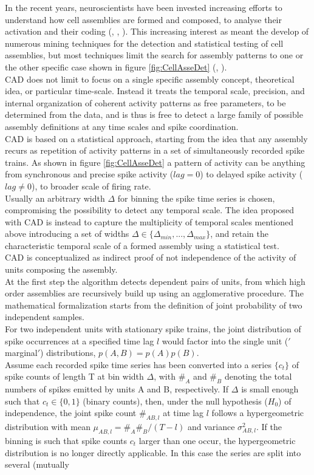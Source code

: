 \begin{framed}
In the recent years, neuroscientists have been invested increasing efforts to understand how cell assemblies are formed and composed, to analyse their activation and their coding (\cite{Buzsaki1}, \cite{Liu}, \cite{Cai}). This increasing interest as meant the develop of numerous mining techniques for the detection and statistical testing of cell assemblies, but most techniques limit the search for assembly patterns to one or the other specific case shown in figure \ref{fig:CellAsseDet} (\cite{Torre}, \cite{Tavoni}).\\CAD does not limit to focus on a single specific assembly concept, theoretical idea, or particular time-scale. Instead it treats the temporal scale, precision, and internal organization of coherent activity patterns as free parameters, to be determined from the data, and is thus is free to detect a large family of possible assembly definitions at any time scales and spike coordination.\\CAD is based on a statistical approach, starting from the idea that any assembly recurs as repetition of activity patterns in a set of simultaneously recorded spike trains. As shown in figure \ref{fig:CellAsseDet} a pattern of activity can be anything from synchronous and precise spike activity ($lag = 0$) to delayed spike activity ($lag\neq 0$), to broader scale of firing rate.\\Usually an arbitrary width $\Delta$ for binning the spike time series is chosen, compromising the possibility to detect any temporal scale. The idea proposed with CAD is instead to capture the multiplicity of temporal scales mentioned above introducing a set of widths $\Delta \in \{\Delta_{min},...,\Delta_{max}\}$, and retain the characteristic temporal scale of a formed assembly using a statistical test.\\CAD is conceptualized as indirect proof of not independence of the activity of units composing the assembly.\\At the first step the algorithm detects dependent pairs of units, from which high order assemblies are recursively build up using an agglomerative procedure. The mathematical formalization starts from the definition of joint probability of two independent samples.\\For two independent units with stationary spike trains, the joint distribution of spike occurrences at a specified time lag $l$ would factor into the single unit ($'$marginal$'$) distributions, $p(A,B)=p(A)p(B)$.\\ Assume each recorded spike time series has been converted into a series $\{c_t\}$ of spike counts of length T at bin width $\Delta$, with $\#_A$ and $\#_B$ denoting the total numbers of spikes emitted by units A and B, respectively. If $\Delta$ is small enough such that $c_t\in\{0,1\}$ (binary counts), then, under the null hypothesis ($H_0$) of independence, the joint spike count $\#_{AB,l}$ at time lag $l$ follows a hypergeometric distribution with mean $\mu_{AB,l}=\#_A \#_B/(T-l)$ and variance $\sigma^{2}_{AB,l}$. If the binning is such that spike counts $c_t$ larger than one occur, the hypergeometric distribution is no longer directly applicable. In this case the series are split into several (mutually 
\end{framed}
